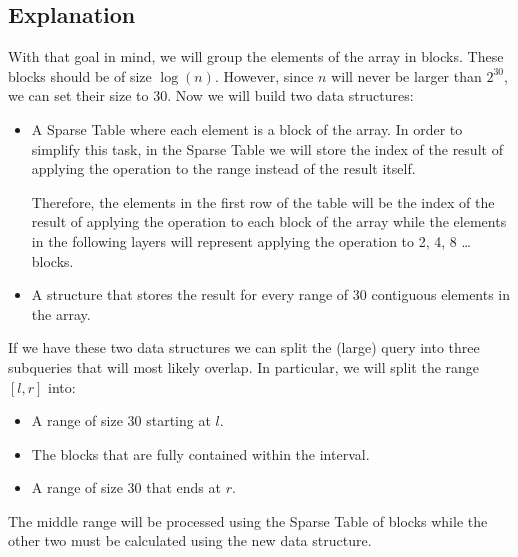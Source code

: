 \subsection*{Explanation}
With that goal in mind, we will group the elements of the array in blocks.
These blocks should be of size $\log (n)$. However, since $n$ will never
be larger than $2^{30}$, we can set their size to 30. Now  we will build 
two data structures:
\begin{itemize}
		\setlength{\itemsep}{2pt}
		\item A Sparse Table where each element is a block of the array. 
				In order to simplify this task, in the Sparse Table we will
				store the index of the result of applying the operation to the 
				range instead of the result itself. 

				Therefore, the elements in the first row of the table will be the 
				index of the result of applying the operation to each block of the array while
				the elements in the following layers will represent applying the
				operation to 2, 4, 8 \dots blocks.

		\item A structure that stores the result for every range of 30 contiguous 
				elements in the array.
\end{itemize}

If we have these two data structures we can split the (large) query into three subqueries
that will most likely overlap. In particular, we will split the range $[l, r]$ into:
\begin{itemize}
		\setlength{\itemsep}{0pt}
		\item A range of size 30 starting at $l$.
		\item The blocks that are fully contained within the interval.
		\item A range of size 30 that ends at $r$.
\end{itemize}
The middle range will be processed using the Sparse Table of blocks while the other 
two must be calculated using the new data structure.

